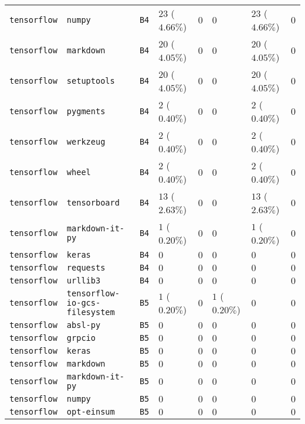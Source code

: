 \begin{table}
\begin{tabular}{llllllll}
\texttt{tensorflow} & \texttt{numpy} & \texttt{B4} & $23$ ($4.66\%$) & $0$ & $0$ & $23$ ($4.66\%$) & $0$ \\
\texttt{tensorflow} & \texttt{markdown} & \texttt{B4} & $20$ ($4.05\%$) & $0$ & $0$ & $20$ ($4.05\%$) & $0$ \\
\texttt{tensorflow} & \texttt{setuptools} & \texttt{B4} & $20$ ($4.05\%$) & $0$ & $0$ & $20$ ($4.05\%$) & $0$ \\
\texttt{tensorflow} & \texttt{pygments} & \texttt{B4} & $2$ ($0.40\%$) & $0$ & $0$ & $2$ ($0.40\%$) & $0$ \\
\texttt{tensorflow} & \texttt{werkzeug} & \texttt{B4} & $2$ ($0.40\%$) & $0$ & $0$ & $2$ ($0.40\%$) & $0$ \\
\texttt{tensorflow} & \texttt{wheel} & \texttt{B4} & $2$ ($0.40\%$) & $0$ & $0$ & $2$ ($0.40\%$) & $0$ \\
\texttt{tensorflow} & \texttt{tensorboard} & \texttt{B4} & $13$ ($2.63\%$) & $0$ & $0$ & $13$ ($2.63\%$) & $0$ \\
\texttt{tensorflow} & \texttt{markdown-it-py} & \texttt{B4} & $1$ ($0.20\%$) & $0$ & $0$ & $1$ ($0.20\%$) & $0$ \\
\texttt{tensorflow} & \texttt{keras} & \texttt{B4} & $0$ & $0$ & $0$ & $0$ & $0$ \\
\texttt{tensorflow} & \texttt{requests} & \texttt{B4} & $0$ & $0$ & $0$ & $0$ & $0$ \\
\texttt{tensorflow} & \texttt{urllib3} & \texttt{B4} & $0$ & $0$ & $0$ & $0$ & $0$ \\
\texttt{tensorflow} & \texttt{tensorflow-io-gcs-filesystem} & \texttt{B5} & $1$ ($0.20\%$) & $0$ & $1$ ($0.20\%$) & $0$ & $0$ \\
\texttt{tensorflow} & \texttt{absl-py} & \texttt{B5} & $0$ & $0$ & $0$ & $0$ & $0$ \\
\texttt{tensorflow} & \texttt{grpcio} & \texttt{B5} & $0$ & $0$ & $0$ & $0$ & $0$ \\
\texttt{tensorflow} & \texttt{keras} & \texttt{B5} & $0$ & $0$ & $0$ & $0$ & $0$ \\
\texttt{tensorflow} & \texttt{markdown} & \texttt{B5} & $0$ & $0$ & $0$ & $0$ & $0$ \\
\texttt{tensorflow} & \texttt{markdown-it-py} & \texttt{B5} & $0$ & $0$ & $0$ & $0$ & $0$ \\
\texttt{tensorflow} & \texttt{numpy} & \texttt{B5} & $0$ & $0$ & $0$ & $0$ & $0$ \\
\texttt{tensorflow} & \texttt{opt-einsum} & \texttt{B5} & $0$ & $0$ & $0$ & $0$ & $0$ \\

\end{tabular}
\end{table}
